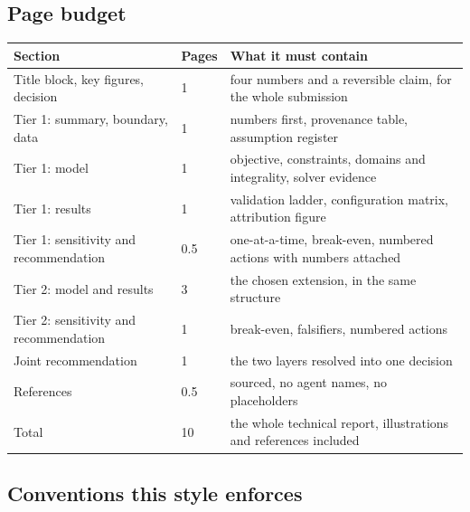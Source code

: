 \documentclass[11pt,a4paper]{article}
\begin{document}
{\small

\subsection*{Page budget}

{\small
\begin{tabularx}{\linewidth}{@{}L{5.4cm}C{1.6cm}Y@{}}
\toprule
\sffamily\bfseries Section & \sffamily\bfseries Pages & \sffamily\bfseries What it must contain \\
\midrule
Title block, key figures, decision & 1 & four numbers and a reversible claim, for the whole submission \\
Tier 1: summary, boundary, data & 1 & numbers first, provenance table, assumption register \\
Tier 1: model & 1 & objective, constraints, domains and integrality, solver evidence \\
Tier 1: results & 1 & validation ladder, configuration matrix, attribution figure \\
Tier 1: sensitivity and recommendation & 0.5 & one-at-a-time, break-even, numbered actions with numbers attached \\
Tier 2: model and results & 3 & the chosen extension, in the same structure \\
Tier 2: sensitivity and recommendation & 1 & break-even, falsifiers, numbered actions \\
Joint recommendation & 1 & the two layers resolved into one decision \\
References & 0.5 & sourced, no agent names, no placeholders \\
\midrule
Total & 10 & the whole technical report, illustrations and references included \\
\bottomrule
\end{tabularx}}


\subsection*{Conventions this style enforces}

}
\end{document}
